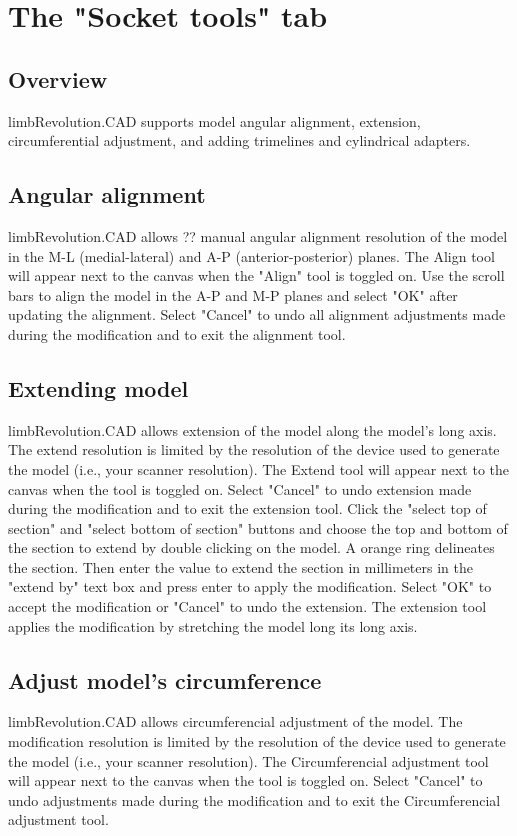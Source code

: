 \documentclass[twoside,a4paper]{refrep}
\begin{document}
	\section{The "Socket tools" tab}
	\subsection{Overview}
	limbRevolution.CAD supports model angular alignment, extension, circumferential adjustment, and adding trimelines and cylindrical adapters.
	\subsection{Angular alignment}
	limbRevolution.CAD allows ?? manual angular alignment resolution of the model in the M-L (medial-lateral) and A-P (anterior-posterior) planes. The Align tool will appear next to the canvas when the "Align" tool is toggled on. Use the scroll bars to align the model in the A-P and M-P planes and select "OK" after updating the alignment. Select "Cancel" to undo all alignment adjustments made during the modification and to exit the alignment tool.
	\subsection{Extending model}
	limbRevolution.CAD allows extension of the model along the model's long axis. The extend resolution is limited by the resolution of the device used to generate the model (i.e., your scanner resolution). The Extend tool will appear next to the canvas when the tool is toggled on. Select "Cancel" to undo extension made during the modification and to exit the extension tool. Click the "select top of section" and "select bottom of section" buttons and choose the top and bottom of the section to extend by double clicking on the model. A orange ring delineates the section. Then enter the value to extend the section in millimeters in the "extend by" text box and press enter to apply the modification. Select "OK" to accept the modification or "Cancel" to undo the extension. The extension tool applies the modification by stretching the model long its long axis.
	\subsection{Adjust model's circumference}
	limbRevolution.CAD allows circumferencial adjustment of the model. The modification resolution is limited by the resolution of the device used to generate the model (i.e., your scanner resolution). The Circumferencial adjustment tool will appear next to the canvas when the tool is toggled on. Select "Cancel" to undo adjustments made during the modification and to exit the Circumferencial adjustment tool.
\end{document}
